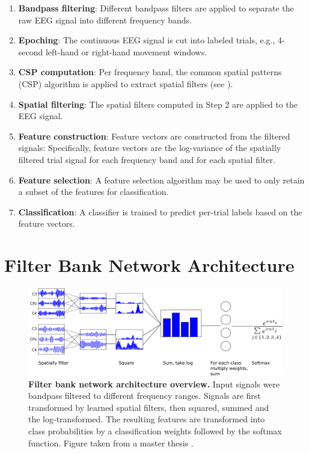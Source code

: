 \begin{enumerate}
\item
  \textbf{Bandpass filtering}: Different bandpass filters are applied to
  separate the raw EEG signal into different frequency bands.
\item
  \textbf{Epoching}: The continuous EEG signal is cut into labeled
  trials, e.g., 4-second left-hand or right-hand movement windows.
\item
  \textbf{CSP computation}: Per frequency band, the common spatial
  patterns (CSP) algorithm is applied to extract spatial filters (see
  ).
\item
  \textbf{Spatial filtering}: The spatial filters computed in Step 2 are
  applied to the EEG signal.
\item
  \textbf{Feature construction}: Feature vectors are constructed from
  the filtered signals: Specifically, feature vectors are the
  log-variance of the spatially filtered trial signal for each frequency
  band and for each spatial filter.
\item
  \textbf{Feature selection}: A feature selection algorithm may be used
  to only retain a subset of the features for classification.
\item
  \textbf{Classification}: A classifier is trained to predict per-trial
  labels based on the feature vectors.
\end{enumerate}

\section{Filter Bank Network
Architecture}\label{filter-bank-network-architecture}


\begin{figure}[ht]
    \myfloatalign
    \includegraphics[width=1\linewidth]{images/csp_as_a_net_explanation.png}
    \caption[Filter bank network architecture overview.]{
\textbf{Filter bank network architecture overview.} Input signals were
bandpass filtered to different frequency ranges. Signals are first
transformed by learned spatial filters, then squared, summed and the
log-transformed. The resulting features are transformed into class
probabilities by a classification weights followed by the softmax
function. Figure taken from a master thesis
\citep{schirrmeister_msc_thesis_2015}.}\label{filterbank-net-figure}
\end{figure}


